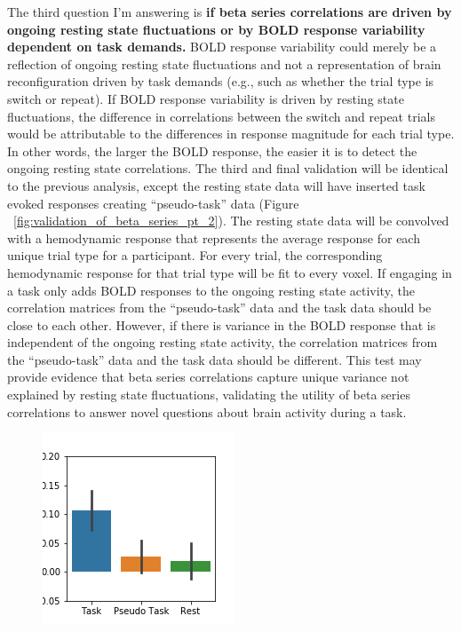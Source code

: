 \documentclass[phd,appendix,figures]{uithesis}
\begin{document}
\begin{itemize}
The third question I'm answering is \textbf{if beta series correlations are driven by ongoing resting state fluctuations or by BOLD response variability dependent on task demands.}
BOLD response variability could merely be a reflection of ongoing resting state fluctuations and not a representation of brain reconfiguration driven by task demands (e.g., such as whether the trial type is switch or repeat).
If BOLD response variability is driven by resting state fluctuations, the difference in correlations between the switch and repeat trials would be attributable to the differences in response magnitude for each trial type.
In other words, the larger the BOLD response, the easier it is to detect the ongoing resting state correlations.
The third and final validation will be identical to the previous analysis, except the resting state data will have inserted task evoked responses creating “pseudo-task” data (Figure ~\ref{fig:validation_of_beta_series_pt_2}).
The resting state data will be convolved with a hemodynamic response that represents the average response for each unique trial type for a participant.
For every trial, the corresponding hemodynamic response for that trial type will be fit to every voxel.
If engaging in a task only adds BOLD responses to the ongoing resting state activity, the correlation matrices from the “pseudo-task” data and the task data should be close to each other.
However, if there is variance in the BOLD response that is independent of the ongoing resting state activity, the correlation matrices from the “pseudo-task” data and the task data should be different.
This test may provide evidence that beta series correlations capture unique variance not explained by resting state fluctuations, validating the utility of beta series correlations to answer novel questions about brain activity during a task.
\begin{figure}[H]%
	\centering
	\includegraphics[width=1\linewidth]{aim_1_validation}

\end{figure}
\end{itemize}
\end{document}
